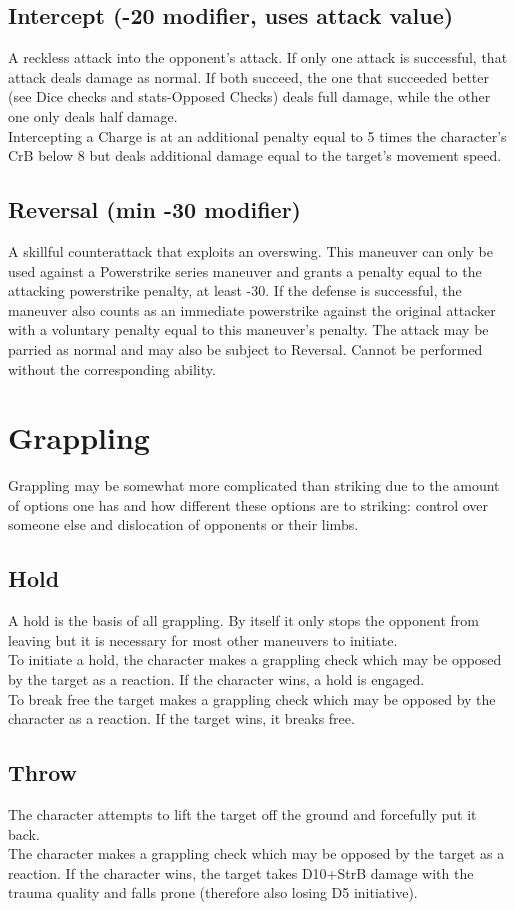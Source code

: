 \documentclass[12pt,a4paper]{book}
\begin{document}
	\subsection*{Intercept (-20 modifier, uses attack value)}
	A reckless attack into the opponent's attack. If only one attack is successful, that attack deals damage as normal. If both succeed, the one that succeeded better (see Dice checks and stats-Opposed Checks) deals full damage, while the other one only deals half damage.\\
	Intercepting a Charge is at an additional penalty equal to 5 times the character’s CrB below 8 but deals additional damage equal to the target’s movement speed.
	\subsection*{Reversal (min -30 modifier)}
	A skillful counterattack that exploits an overswing. This maneuver can only be used against a Powerstrike series maneuver and grants a penalty equal to the attacking powerstrike penalty, at least -30. If the defense is successful, the maneuver also counts as an immediate powerstrike against the original attacker with a voluntary penalty equal to this maneuver’s penalty. The attack may be parried as normal and may also be subject to Reversal. Cannot be performed without the corresponding ability.
	\section{Grappling}
	Grappling may be somewhat more complicated than striking due to the amount of options one has and how different these options are to striking: control over someone else and dislocation of opponents or their limbs.
	\subsection*{Hold}
	A hold is the basis of all grappling. By itself it only stops the opponent from leaving but it is necessary for most other maneuvers to initiate.\\
	To initiate a hold, the character makes a grappling check which may be opposed by the target as a reaction. If the character wins, a hold is engaged.\\
	To break free the target makes a grappling check which may be opposed by the character as a reaction. If the target wins, it breaks free.
	\subsection*{Throw}
	The character attempts to lift the target off the ground and forcefully put it back.\\
	The character makes a grappling check which may be opposed by the target as a reaction. If the character wins, the target takes D10+StrB damage with the trauma quality and falls prone (therefore also losing D5 initiative).
\end{document}
